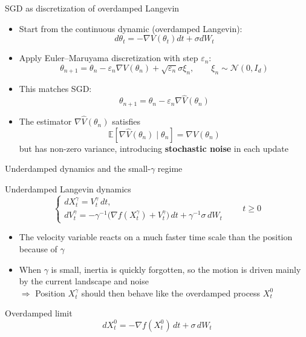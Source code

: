 \documentclass{beamer}
\newcommand{\<}{\langle}
\renewcommand{\>}{\rangle}
\begin{document}
\begin{frame}{SGD as discretization of overdamped Langevin}

    \begin{itemize}
        \item Start from the continuous dynamic (overdamped Langevin):
        \[
        d\theta_t=-\nabla V(\theta_t)dt+\sigma dW_t
        \]
        
        \bigskip

        \item Apply Euler--Maruyama discretization with step $\varepsilon_n$:
        \[
        \theta_{n+1}
        =\theta_n-\varepsilon_n\nabla V(\theta_n)
        +\sqrt{\varepsilon_n}\sigma\xi_n,
        \qquad \xi_n\sim\mathcal N(0,I_d)
        \]

        \bigskip

        \item This matches SGD:
        \[
        \theta_{n+1}=\theta_n-\varepsilon_n\nabla \hat V(\theta_n)
        \]
        
        \item The estimator $\nabla \hat V(\theta_n)$ satisfies
        \[
        \mathbb E[\nabla \hat V(\theta_n)\mid \theta_n]=\nabla V(\theta_n)
        \]
        but has non-zero variance, introducing \textbf{stochastic noise} in each update
    \end{itemize}
\end{frame}

\begin{frame}{Underdamped dynamics and the small-$\gamma$ regime}
    \begin{block}{Underdamped Langevin dynamics}
        \[
        \begin{cases}
            dX_t^\gamma = V_t^\gamma\,dt,\\[0.3em]
            dV_t^\gamma = -\gamma^{-1}\bigl(\nabla f(X_t^\gamma)+V_t^\gamma\bigr)\,dt
            +\gamma^{-1}\sigma\,dW_t
        \end{cases}
        \qquad t\ge 0
        \]
    \end{block}
    \begin{itemize}
        \item The velocity variable reacts on a much faster time scale than the position because of $\gamma$
        \item When $\gamma$ is small, inertia is quickly forgotten, so the motion is driven mainly by the current landscape and noise\\
        
        \medskip 
        $\Rightarrow$ Position $X_t^\gamma$ should then behave like the overdamped process $X_t^0$
    \end{itemize}
    \begin{block}{Overdamped limit}
        \[
            dX_t^0=-\nabla f(X_t^0)\,dt+\sigma\,dW_t
        \]
    \end{block}
\end{frame}
\end{document}

